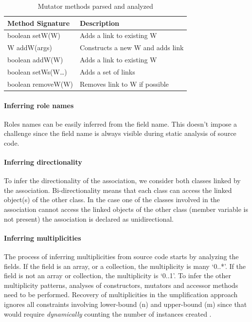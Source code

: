 \begin{table}
\caption{Mutator methods parsed and analyzed}
\label{table:mutators}
\centering
    \begin{tabular}{ll}
		\toprule
		\rowcolor[HTML]{BBDAFF}
        \textbf{Method Signature}   & \textbf{Description}    \\ 
        \hline
        boolean setW(W)   & Adds a link to existing W   		\\ 
        W addW(args)    & Constructs a new W and adds link      \\ 
        boolean addW(W)  & Adds a link to existing W            \\ 
        boolean setWs(W…)    & Adds a set of links              \\ 
        boolean removeW(W) &   Removes link to W if possible    \\
        \hline
    \end{tabular}
\end{table}

\paragraph*{Inferring role names}

Roles names can be easily inferred from the field name. This doesn't impose a challenge since the field name is always visible during static analysis of source code.

\paragraph*{Inferring directionality}

To infer the directionality of the association, we consider both classes linked by the association. Bi-directionality means that each class can access the linked object(s) of the other class. In the case one of the classes involved in the association cannot access the linked objects of the other class (member variable is not present) the association is declared as unidirectional.

\paragraph*{Inferring multiplicities}

The process of inferring multiplicities from source code starts by analyzing the fields. If the field is an array, or a collection, the multiplicity is many `0..*'. If the field is not an array or collection, the multiplicity is `0..1'. To infer the other multiplicity patterns, analyses of constructors, mutators and accessor methods need to be performed. Recovery of multiplicities in the umplification approach ignores all constraints involving lower-bound (n) and upper-bound (m) since that would require \textit{dynamically} counting the number of instances created \cite{Kollmann2001}.

